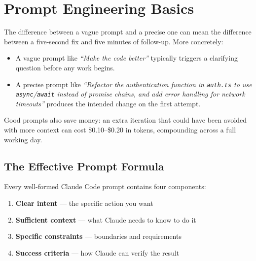 \chapter{Prompt Engineering Basics}
\label{ch:prompt-basics}


The difference between a vague prompt and a precise one can mean the difference
between a five-second fix and five minutes of follow-up. More concretely:

\begin{itemize}
  \item A vague prompt like \emph{``Make the code better''} typically triggers
        a clarifying question before any work begins.
  \item A precise prompt like \emph{``Refactor the authentication function in
        \texttt{auth.ts} to use \texttt{async}/\texttt{await} instead of
        promise chains, and add error handling for network timeouts''} produces
        the intended change on the first attempt.
\end{itemize}

Good prompts also save money: an extra iteration that could have been avoided
with more context can cost \$0.10–\$0.20 in tokens, compounding across a
full working day.

\section{The Effective Prompt Formula}
\label{sec:prompt-formula}

Every well-formed Claude Code prompt contains four components:

\begin{enumerate}
  \item \textbf{Clear intent} — the specific action you want
  \item \textbf{Sufficient context} — what Claude needs to know to do it
  \item \textbf{Specific constraints} — boundaries and requirements
  \item \textbf{Success criteria} — how Claude can verify the result
\end{enumerate}

